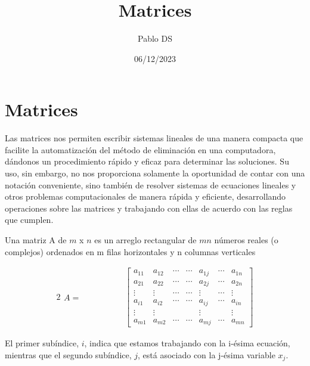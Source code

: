 \documentclass{article}
\title{Matrices}
\author{Pablo DS}
\date{06/12/2023}
\begin{document}
\maketitle
\section{Matrices}

Las matrices nos permiten escribir sistemas lineales de una manera compacta que facilite la automatización del método de eliminación en una computadora, dándonos un procedimiento rápido y eficaz para determinar las soluciones. Su uso, sin embargo, no nos proporciona solamente la oportunidad de contar con una notación conveniente, sino también de resolver sistemas de ecuaciones lineales y otros problemas computacionales de manera rápida y eficiente, desarrollando operaciones sobre las matrices y trabajando con ellas de acuerdo con las reglas que cumplen.

\begin{tcolorbox}[colback=blue!10!white,colframe=blue!60!black,title=Definición]
    Una matriz A de $m$ x $n$ es un arreglo rectangular de $mn$ números reales (o complejos) ordenados en m filas horizontales y n columnas verticales
\end{tcolorbox}

\begin{alignat*}{2}
    \begin{split}
        A = 
    \end{split} 
& \hspace{ 4em}%
    \begin{bmatrix}
        a_{11} & a_{12} & \dotsb & \dotsb & a_{1j} & \dotsb & a_{1n}\\
        a_{21} & a_{22} & \dotsb & \dotsb & a_{2j} & \dotsb & a_{2n}\\
        \vdots & \vdots & \dotsb & \dotsb & \vdots & \dotsb & \vdots\\
        a_{i1} & a_{i2} & \dotsb & \dotsb & a_{ij} & \dotsb & a_{in}\\
        \vdots & \vdots &  &  & \vdots &  & \vdots\\
        a_{m1} & a_{m2} & \dotsb & \dotsb & a_{mj} & \dotsb & a_{mn}
    \end{bmatrix} 
\end{alignat*}

El primer subíndice, $i$, indica que estamos trabajando con la i-ésima ecuación, mientras que el segundo subíndice, $j$, está asociado con la j-ésima variable $x_j$.
\end{document}
